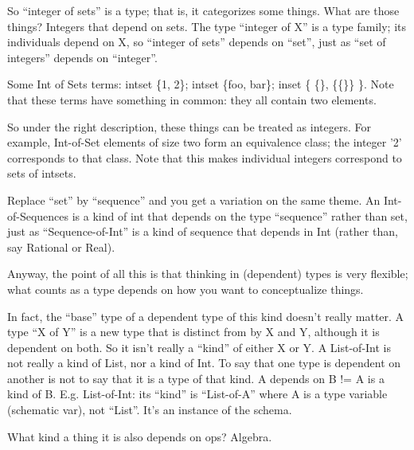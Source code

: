 So ``integer of sets'' is a type; that is, it categorizes some things.
What are those things?  Integers that depend on sets.  The type
``integer of X'' is a type family; its individuals depend on X, so
``integer of sets'' depends on ``set'', just as ``set of integers''
depends on ``integer''.

Some Int of Sets terms: intset \{1, 2\}; intset \{foo, bar\}; inset \{
\{\}, \{\{\}\} \}.  Note that these terms have something in common:
they all contain two elements.

So under the right description, these things can be treated as
integers.  For example, Int-of-Set elements of size two form an
equivalence class; the integer '2' corresponds to that class.  Note
that this makes individual integers correspond to sets of intsets.

Replace ``set'' by ``sequence'' and you get a variation on the same
theme.  An Int-of-Sequences is a kind of int that depends on the type
``sequence'' rather than set, just as ``Sequence-of-Int'' is a kind of
sequence that depends in Int (rather than, say Rational or Real).

Anyway, the point of all this is that thinking in (dependent) types is
very flexible; what counts as a type depends on how you want to
conceptualize things.

In fact, the ``base'' type of a dependent type of this kind doesn't
really matter.  A type ``X of Y'' is a new type that is distinct from
by X and Y, although it is dependent on both.  So it isn't really a
``kind'' of either X or Y.  A List-of-Int is not really a kind of
List, nor a kind of Int.  To say that one type is dependent on another
is not to say that it is a type of that kind.  A depends on B != A is
a kind of B.  E.g. List-of-Int: its ``kind'' is ``List-of-A'' where A
is a type variable (schematic var), not ``List''.  It's an instance of
the schema.

What kind a thing it is also depends on ops?  Algebra.
